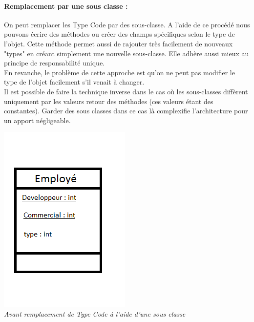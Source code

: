 \documentclass[a4paper,twoside,12pt,openright]{report}
\begin{document}
\paragraph{Remplacement par une sous classe :}
On peut remplacer les Type Code par des sous-classe. A l'aide de ce procédé nous pouvons écrire des méthodes ou créer des champs spécifiques selon le type de l'objet. Cette méthode permet aussi de rajouter très facilement de nouveaux "types" en créant simplement une nouvelle sous-classe.
Elle adhère aussi mieux au principe de responsabilité unique.\\
En revanche, le problème de cette approche est qu'on ne peut pas modifier le type de l'objet facilement s'il venait à changer.\\
Il est possible de faire la technique inverse dans le cas où les sous-classes diffèrent uniquement par les valeurs retour des méthodes (ces valeurs étant des constantes). Garder des sous classes dans ce cas là complexifie l'architecture pour un apport négligeable.

\begin{center}
\includegraphics[scale=1]{Image/TypeCode_SousClasse.png}\\
\itshape{Avant remplacement de Type Code à l'aide d'une sous classe}
\end{center}
\end{document}
